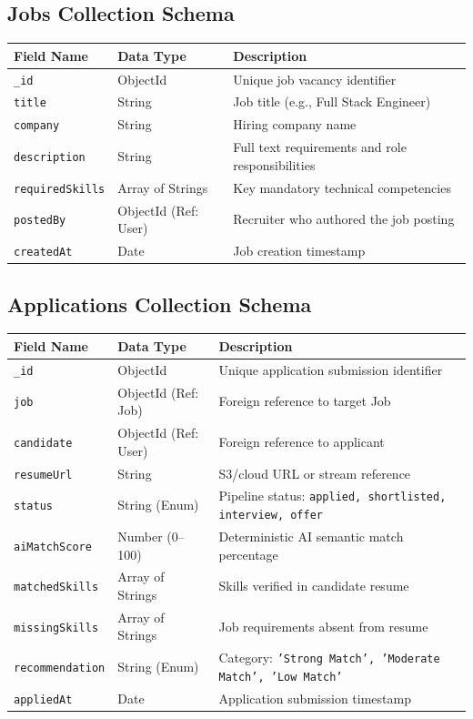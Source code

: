 \documentclass[12pt, a4paper]{article}
\begin{document}
\subsection{Jobs Collection Schema}
\begin{center}
\renewcommand{\arraystretch}{1.15}
\begin{tabularx}{\textwidth}{l p{3.2cm} X}
\toprule
\textbf{\color{primary}Field Name} & \textbf{\color{primary}Data Type} & \textbf{\color{primary}Description} \\
\midrule
\texttt{\_id} & ObjectId & Unique job vacancy identifier \\
\texttt{title} & String & Job title (e.g., Full Stack Engineer) \\
\texttt{company} & String & Hiring company name \\
\texttt{description} & String & Full text requirements and role responsibilities \\
\texttt{requiredSkills} & Array of Strings & Key mandatory technical competencies \\
\texttt{postedBy} & ObjectId (Ref: User) & Recruiter who authored the job posting \\
\texttt{createdAt} & Date & Job creation timestamp \\
\bottomrule
\end{tabularx}
\end{center}

\subsection{Applications Collection Schema}
\begin{center}
\renewcommand{\arraystretch}{1.15}
\begin{tabularx}{\textwidth}{l p{3.2cm} X}
\toprule
\textbf{\color{primary}Field Name} & \textbf{\color{primary}Data Type} & \textbf{\color{primary}Description} \\
\midrule
\texttt{\_id} & ObjectId & Unique application submission identifier \\
\texttt{job} & ObjectId (Ref: Job) & Foreign reference to target Job \\
\texttt{candidate} & ObjectId (Ref: User)& Foreign reference to applicant \\
\texttt{resumeUrl} & String & S3/cloud URL or stream reference \\
\texttt{status} & String (Enum) & Pipeline status: \texttt{applied, shortlisted, interview, offer} \\
\texttt{aiMatchScore} & Number (0--100) & Deterministic AI semantic match percentage \\
\texttt{matchedSkills} & Array of Strings & Skills verified in candidate resume \\
\texttt{missingSkills} & Array of Strings & Job requirements absent from resume \\
\texttt{recommendation}& String (Enum) & Category: \texttt{'Strong Match', 'Moderate Match', 'Low Match'} \\
\texttt{appliedAt} & Date & Application submission timestamp \\
\bottomrule
\end{tabularx}
\end{center}
\end{document}
